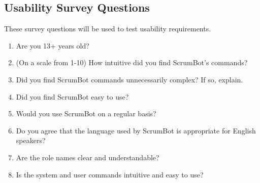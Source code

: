 \documentclass[12pt, titlepage]{article}
\begin{document}
\subsection{Usability Survey Questions}
These survey questions will be used to test usability requirements.
\begin{enumerate}
    \item Are you 13+ years old?
    \item (On a scale from 1-10) How intuitive did you find ScrumBot's commands?
    \item Did you find ScrumBot commands unnecessarily complex? If so, explain.
    \item Did you find ScrumBot easy to use?
    \item Would you use ScrumBot on a regular basis?
    \item Do you agree that the language used by ScrumBot is appropriate for English speakers?
    \item Are the role names clear and understandable?
    \item Is the system and user commands intuitive and easy to use?
\end{enumerate}
\end{document}
